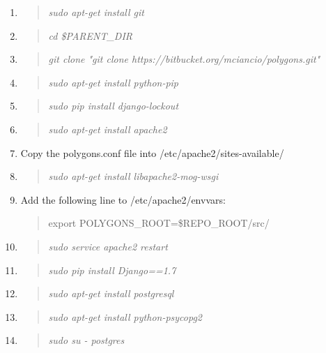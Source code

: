 \documentclass[12pt]{article}
\newenvironment{command}
   { 
      \begin{quote}\itshape
      \color{blue}
   }
   { \end{quote} }
\newenvironment{data}
   { 
      \begin{quote}\itshape
      \color{red}
   }
   { \end{quote} }
\begin{document}
\begin{enumerate}
   \item \begin{command} sudo apt-get install git \end{command}
   \item \begin{command} cd \$PARENT\_DIR \end{command}
   \item \begin{command} git clone "git clone
         https://bitbucket.org/mciancio/polygons.git" \end{command}
   \item \begin{command} sudo apt-get install python-pip \end{command}
   \item \begin{command} sudo pip install django-lockout \end{command}
   \item \begin{command} sudo apt-get install apache2 \end{command}
   \item Copy the polygons.conf file into /etc/apache2/sites-available/
   \item \begin{command} sudo apt-get install libapache2-mog-wsgi \end{command}
   \item Add the following line to /etc/apache2/envvars:
         \begin{data}
         export POLYGONS\_ROOT=\$REPO\_ROOT/src/
         \end{data}
   \item \begin{command} sudo service apache2 restart \end{command}
   \item \begin{command} sudo pip install Django==1.7 \end{command}
   \item \begin{command} sudo apt-get install postgresql \end{command}
   \item \begin{command} sudo apt-get install python-psycopg2 \end{command}
   \item \begin{command} sudo su - postgres \end{command}

\end{enumerate}
\end{document}
